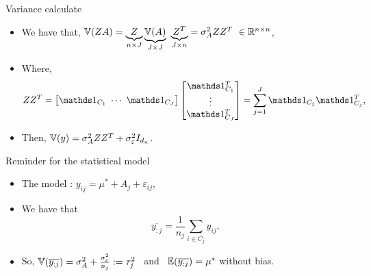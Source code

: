 \documentclass[unknownkeysallowed]{beamer}
\begin{document}
\begin{frame}{Variance calculate}

    \begin{itemize} 
        \item We have that, $\mathbb{V}(ZA) = \underbrace{Z}_{n\times J} \underbrace{\mathbb{V}(A)}_{J\times J} \  \underbrace{Z^T}_{J\times n} = \sigma^2_A Z Z^T \ \in \mathbb{R}^{n\times n}$, 
        \item Where, \[ ZZ^T = \begin{bmatrix} \bbI_{C_1}\  \cdots \ \bbI_{C_J} \end{bmatrix} \begin{bmatrix}
        \bbI_{C_1}^T\\
        \vdots \\
        \bbI_{C_J}^T
        \end{bmatrix} = \sum_{j=1}^J \bbI_{C_j} \bbI_{C_j}^T, \]
        \item Then, $\mathbb{V}(y) = \sigma^2_A ZZ^T + \sigma^2_{\varepsilon} I_{d_n}$.
    \end{itemize}
\end{frame}
\begin{frame}{Reminder for the statistical model}

    \begin{itemize} 
        \item The model : $y_{ij} = \mu^* + A_j + \varepsilon_{ij}$, 
        \item We have that \[ \overline{y_{:j}} = \frac{1}{n_j}\sum_{i \in C_j} y_{ij}, \] 
        \item So, $\mathbb{V}(\overline{y_{:j}}) = \sigma_
        A^2 + \frac{\sigma_{\varepsilon}^2}{n_j} := \tau_j^2$ \ and \  $\mathbb{E}(\overline{y_{:j}}) = \mu^* $ without bias.
    \end{itemize}
\end{frame}
\end{document}
